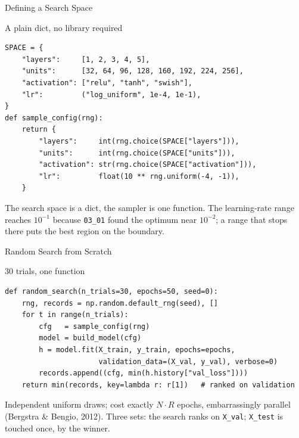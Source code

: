 \documentclass[aspectratio=169,11pt]{beamer}
\begin{document}
\begin{frame}[fragile]{Defining a Search Space}
\begin{block}{A plain dict, no library required}
{\scriptsize
\begin{verbatim}
SPACE = {
    "layers":     [1, 2, 3, 4, 5],
    "units":      [32, 64, 96, 128, 160, 192, 224, 256],
    "activation": ["relu", "tanh", "swish"],
    "lr":         ("log_uniform", 1e-4, 1e-1),
}
def sample_config(rng):
    return {
        "layers":     int(rng.choice(SPACE["layers"])),
        "units":      int(rng.choice(SPACE["units"])),
        "activation": str(rng.choice(SPACE["activation"])),
        "lr":         float(10 ** rng.uniform(-4, -1)),
    }
\end{verbatim}
}
\end{block}
{\scriptsize The search space is a dict, the sampler is one function. The learning-rate range reaches $10^{-1}$ because \texttt{03\_01} found the optimum near $10^{-2}$; a range that stops there puts the best region on the boundary.}
\end{frame}

\begin{frame}[fragile]{Random Search from Scratch}
\begin{block}{30 trials, one function}
{\scriptsize
\begin{verbatim}
def random_search(n_trials=30, epochs=50, seed=0):
    rng, records = np.random.default_rng(seed), []
    for t in range(n_trials):
        cfg   = sample_config(rng)
        model = build_model(cfg)
        h = model.fit(X_train, y_train, epochs=epochs,
                      validation_data=(X_val, y_val), verbose=0)
        records.append((cfg, min(h.history["val_loss"])))
    return min(records, key=lambda r: r[1])   # ranked on validation
\end{verbatim}
}
\end{block}
{\scriptsize Independent uniform draws; cost exactly $N \cdot R$ epochs, embarrassingly parallel (Bergstra \& Bengio, 2012). Three sets: the search ranks on \texttt{X\_val}; \texttt{X\_test} is touched once, by the winner.}
\end{frame}
\end{document}
